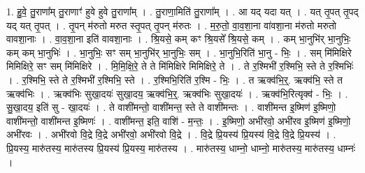 \documentclass[17pt]{extarticle}
\begin{document}
1. हु॒वे॒ तु॒राणा᳚म् तु॒राणाꣳ॑ हुवे हुवे तु॒राणा᳚म् । . तु॒राणा॒मिति॑ तु॒राणा᳚म् । . आ यद् यदा यत् । . यत् तृ॒पत् तृ॒पद् यद् यत् तृ॒पत् । . तृ॒पन् म॑रुतो मरुत स्तृ॒पत् तृ॒पन् म॑रुतः । . म॒रु॒तो॒ वा॒व॒शा॒ना वा॑वशा॒ना म॑रुतो मरुतो वावशा॒नाः । . वा॒व॒शा॒ना इति॑ वावशा॒नाः । . श्रि॒यसे॒ कम् कꣳ श्रि॒यसे᳚ श्रि॒यसे॒ कम् । . कम् भा॒नुभि॑र् भा॒नुभिः॒ कम् कम् भा॒नुभिः॑ । . भा॒नुभिः॒ सꣳ सम् भा॒नुभि॑र् भा॒नुभिः॒ सम् । . भा॒नुभि॒रिति॑ भा॒नु - भिः॒ । . सम् मि॑मिक्षिरे मिमिक्षिरे॒ सꣳ सम् मि॑मिक्षिरे । . मि॒मि॒क्षि॒रे॒ ते ते मि॑मिक्षिरे मिमिक्षिरे॒ ते । . ते र॒श्मिभी॑ र॒श्मिभि॒ स्ते ते र॒श्मिभिः॑ । . र॒श्मिभि॒ स्ते ते र॒श्मिभी॑ र॒श्मिभि॒ स्ते । . र॒श्मिभि॒रिति॑ र॒श्मि - भिः॒ । . त ऋक्व॑भि॒र्॒. ऋक्व॑भि॒ स्ते त ऋक्व॑भिः । . ऋक्व॑भिः सुखा॒दयः॑ सुखा॒दय॒ ऋक्व॑भि॒र्॒. ऋक्व॑भिः सुखा॒दयः॑ । . ऋक्व॑भि॒रित्यृक्व॑ - भिः॒ । . सु॒खा॒दय॒ इति॑ सु - खा॒दयः॑ । . ते वाशी॑मन्तो॒ वाशी॑मन्त॒ स्ते ते वाशी॑मन्तः । . वाशी॑मन्त इ॒ष्मिण॑ इ॒ष्मिणो॒ वाशी॑मन्तो॒ वाशी॑मन्त इ॒ष्मिणः॑ । . वाशी॑मन्त॒ इति॒ वाशि॑ - म॒न्तः॒ । . इ॒ष्मिणो॒ अभी॑रवो॒ अभी॑रव इ॒ष्मिण॑ इ॒ष्मिणो॒ अभी॑रवः । . अभी॑रवो वि॒द्रे वि॒द्रे अभी॑रवो॒ अभी॑रवो वि॒द्रे । . वि॒द्रे प्रि॒यस्य॑ प्रि॒यस्य॑ वि॒द्रे वि॒द्रे प्रि॒यस्य॑ । . प्रि॒यस्य॒ मारु॑तस्य॒ मारु॑तस्य प्रि॒यस्य॑ प्रि॒यस्य॒ मारु॑तस्य । . मारु॑तस्य॒ धाम्नो॒ धाम्नो॒ मारु॑तस्य॒ मारु॑तस्य॒ धाम्नः॑ । \newline
\end{document}

